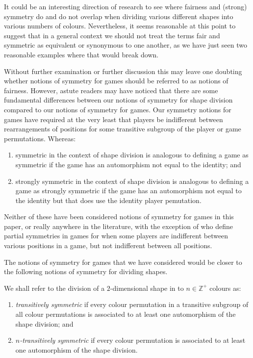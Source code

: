 It could be an interesting direction of research to see where fairness and (strong) symmetry do and do not overlap when dividing various different shapes into various numbers of colours. Nevertheless, it seems reasonable at this point to suggest that in a general context we should not treat the terms fair and symmetric as equivalent or synonymous to one another, as we have just seen two reasonable examples where that would break down.

Without further examination or further discussion this may leave one doubting whether notions of symmetry for games should be referred to as notions of fairness. However, astute readers may have noticed that there are some fundamental differences between our notions of symmetry for shape division compared to our notions of symmetry for games. Our symmetry notions for games have required at the very least that players be indifferent between rearrangements of positions for some transitive subgroup of the player or game permutations. Whereas:
\begin{enumerate}
	\item symmetric in the context of shape division is analogous to defining a game as symmetric if the game has an automorphism not equal to the identity; and
	\item strongly symmetric in the context of shape division is analogous to defining a game as strongly symmetric if the game has an automorphism not equal to the identity but that does use the identity player pemutation.
\end{enumerate}

Neither of these have been considered notions of symmetry for games in this paper, or really anywhere in the literature, with the exception of \cite{ViglizzoarXiv} who define partial symmetries in games for when some players are indifferent between various positions in a game, but not indifferent between all positions. 

The notions of symmetry for games that we have considered would be closer to the following notions of symmetry for dividing shapes. 

\begin{definition}
	We shall refer to the division of a $2$-dimensional shape in to $n \in \mathbb{Z}^+$ colours as:
	\begin{enumerate}
		\item \textit{transitively symmetric} if every colour permutation in a transitive subgroup of all colour permutations is associated to at least one automorphism of the shape division; and
		\item \textit{$n$-transitively symmetric} if every colour permutation is associated to at least one automorphism of the shape division.
	\end{enumerate}
\end{definition}

